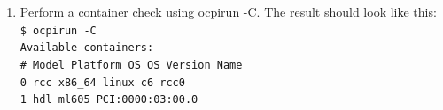 \documentclass{article}
\newcommand{\terminaloutput}[1]{\texttt{#1}}
\begin{document}
\begin{enumerate}
{OpenCPI HDL device found: 'PCI:0000:03:00.0': bitstream date Fri Jun 26 15:14:21 2015, platform "ml605", part "xc6vlx240t", UUID 8cd0a91e-1c37-11e5-8b5f-f30e2f82978a}
\item Perform a container check using ocpirun -C. The result should look like this:\smallskip
\noindent\terminaloutput{\\\$ ocpirun -C\\
Available containers:\\
 \#  Model\hspace{6ex} Platform\hspace{3ex}    OS\hspace{5ex}     OS Version\hspace{1ex}  Name\\
 0  rcc\hspace{9ex}   x86\_64\hspace{5ex}      linux\hspace{2ex}  c6\hspace{10ex}          rcc0\\
  1  hdl\hspace{9ex}   ml605\hspace{29ex}                          PCI:0000:03:00.0}\\
\end{enumerate}
\end{document}
